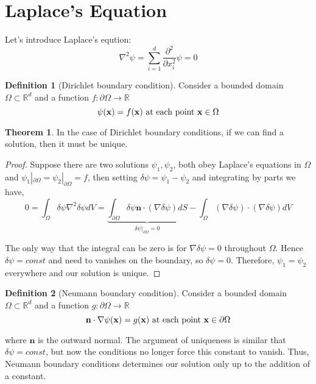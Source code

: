 \documentclass{article}
\theoremstyle{definition}
\newtheorem{definition}{Definition}[section]
\newtheorem{theorem}{Theorem}[section]
\begin{document}
\section{Laplace's Equation}

Let's introduce Laplace's eqution:
\begin{equation}
\nabla ^2 \psi = \sum_{i=1}^d \frac{\partial ^2}{\partial x_i ^2}\psi=0
\end{equation}

\begin{definition}[Dirichlet boundary condition]
Consider a bounded domain $\Omega \subset \mathbb{R}^d$ and a function $f: \partial \Omega \to \mathbb{R}$
\begin{equation}
\psi(\mathbf{x})=f(\mathbf{x}) \ \textup{at each point} \  \mathbf{x}\in \Omega
\end{equation}
\end{definition}

\begin{theorem}
In the case of Dirichlet boundary conditions, if we can find a solution, then it must be unique.
\end{theorem}
\begin{proof}
Suppose there are two solutions $\psi_1, \psi_2$, both obey Laplace's equations in $\Omega$ and $\psi_1|_{\partial \Omega}=\psi_2|_{\partial \Omega}=f$, then setting $\delta \psi=\psi_1-\psi_2$ and integrating by parts we have,
\begin{equation}
0=\int_{\Omega} \delta \psi \nabla^2\delta\psi dV=\underbrace{\int_{\partial \Omega} \delta \psi \mathbf{n} \cdot(\nabla \delta \psi)dS}_{\delta \psi |_{\partial \Omega}=0}-\int_{\Omega}(\nabla \delta \psi) \cdot (\nabla \delta \psi) dV
\end{equation}

The only way that the integral can be zero is for $\nabla \delta \psi=0$ throughout $\Omega$. Hence $\delta \psi=const$ and need to vanishes on the boundary, so $\delta \psi =0$. Therefore, $\psi_1=\psi_2$ everywhere and our solution is unique.  
\end{proof}

\begin{definition}[Neumann boundary condition]
Consider a bounded domain $\Omega \subset \mathbb{R}^d$ and a function $g: \partial \Omega \to \mathbb{R}$
\begin{equation}
\mathbf{n} \cdot \nabla \psi(\mathbf{x})=g(\mathbf{x}) \ \textup{at each point} \ \mathbf{x} \in \partial \Omega
\end{equation}
\end{definition}
where $\mathbf{n}$ is the outward normal. The argument of uniqueness is similar that $\delta \psi=const$, but now the conditions no longer force this constant to vanish. Thus, Neumann boundary conditions determines our solution only up to the addition of a constant.
\end{document}
